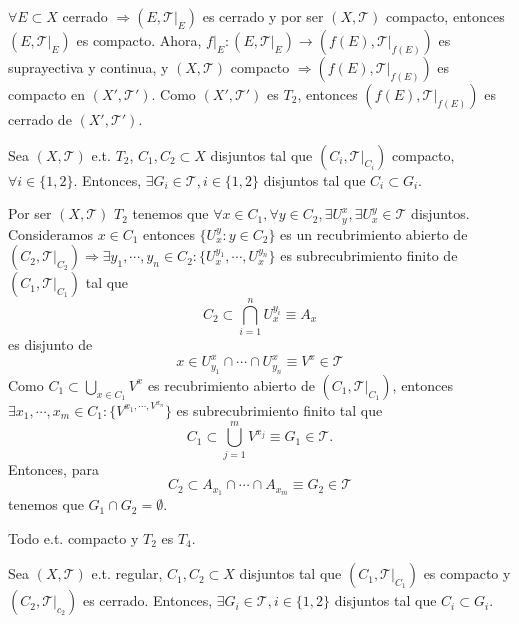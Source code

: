 \begin{dem}
  $\forall E \subset X$ cerrado $\Rightarrow ( E, \mathcal{T}|_{E})$ es cerrado  y por ser $( X, \mathcal{T} )$ compacto, entonces $( E, \mathcal{T}|_{E})$ es compacto. Ahora, $f|_{E} : ( E, \mathcal{T}|_{E}) \to ( f(E), \mathcal{T}|_{f(E)})$ es suprayectiva y continua, y $( X, \mathcal{T} )$ compacto $\Rightarrow ( f(E), \mathcal{T}|_{f(E)})$ es compacto en $( X', \mathcal{T}' )$. Como $( X', \mathcal{T}' )$ es $T_{2}$, entonces $( f(E), \mathcal{T}|_{f(E)})$ es cerrado de $( X', \mathcal{T}' )$.
\end{dem}

\begin{prop}
  Sea $( X, \mathcal{T} )$ e.t. $T_{2}$, $C_{1}, C_{2} \subset X$ disjuntos tal que $( C_{i}, \mathcal{T}|_{C_{i}})$ compacto, $\forall i \in \{ 1, 2 \}$. Entonces, $\exists G_{i} \in \mathcal{T}, i \in \{ 1, 2 \}$ disjuntos tal que $C_{i} \subset G_{i}$.
\end{prop}

\begin{dem}
  Por ser $( X, \mathcal{T} )$ $T_{2}$ tenemos que $\forall x \in C_{1}, \forall y \in C_{2}, \exists U^{x}_{y}, \exists U^{y}_{x} \in \mathcal{T}$ disjuntos. Consideramos $x \in C_{1}$ entonces $\{ U^{y}_{x} : y \in C_{2}\}$ es un recubrimiento abierto de $( C_{2}, \mathcal{T}|_{C_{2}}) \Rightarrow \exists y_{1}, \cdots, y_{n} \in C_{2} : \{ U^{y_{1}}_{x}, \cdots, U^{y_{n}}_{x} \}$ es subrecubrimiento finito de $( C_{1}, \mathcal{T}|_{C_{1}})$ tal que
  \[ 
    C_{2} \subset \bigcap_{i = 1}^{n} U^{y_{i}}_{x} \equiv A_{x} 
  \] 
  es disjunto de
  \[ 
    x \in U^{x}_{y_{1}} \cap \cdots \cap U^{x}_{y_{n}} \equiv V^{x} \in \mathcal{T}
  \] 
  Como $C_{1} \subset \bigcup_{x \in C_{1}} V^{x}$ es recubrimiento abierto de $( C_{1}, \mathcal{T}|_{C_{1}})$, entonces $\exists x_{1}, \cdots, x_{m} \in C_{1} : \{ V^{x_{1}, \cdots, V^{x_{n}}} \}$ es subrecubrimiento finito tal que
  \[ 
    C_{1} \subset \bigcup_{j =1}^{m} V^{x_{j}} \equiv G_{1} \in \mathcal{T}.
  \] 
  Entonces, para
  \[ 
    C_{2} \subset A_{x_{1}} \cap \cdots \cap A_{x_{m}} \equiv G_{2} \in \mathcal{T} 
  \] 
  tenemos que $ G_{1} \cap G_{2} = \emptyset$.

\end{dem}

\begin{cor}
  Todo e.t. compacto y $T_{2}$ es $T_{4}$.
\end{cor}

\begin{prop}
  Sea $( X, \mathcal{T} )$ e.t. regular, $C_{1}, C_{2} \subset X$ disjuntos tal que $( C_{1}, \mathcal{T}|_{C_{1}})$ es compacto y $( C_{2}, \mathcal{T}|_{c_{2}})$ es cerrado. Entonces, $\exists G_{i} \in \mathcal{T}, i \in \{ 1, 2 \}$ disjuntos tal que $C_{i} \subset G_{i}$.
\end{prop}

